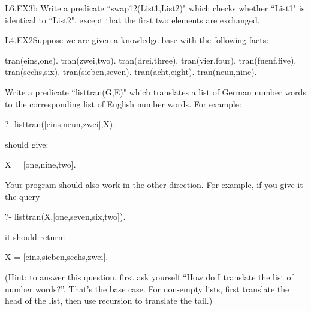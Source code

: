 \begin{LPNexercise}{L6.EX3b}
Write a predicate ``swap12(List1,List2)" which checks
whether ``List1" is identical to ``List2", except that the
first two elements are exchanged.
\end{LPNexercise}


\begin{LPNexercise}{L4.EX2}Suppose we are given a knowledge base with the following facts:

\begin{LPNcodedisplay}
tran(eins,one).
tran(zwei,two).
tran(drei,three).
tran(vier,four).
tran(fuenf,five).
tran(sechs,six).
tran(sieben,seven).
tran(acht,eight).
tran(neun,nine).
\end{LPNcodedisplay}



Write a predicate ``listtran(G,E)" which translates a list of
German number words to the corresponding list of English number words.
For example:
\begin{LPNcodedisplay}
?- listtran([eins,neun,zwei],X).
\end{LPNcodedisplay}
should give:
\begin{LPNcodedisplay}
X = [one,nine,two].
\end{LPNcodedisplay}

Your program should also work in the other direction. For example, if
you give it the query
\begin{LPNcodedisplay}
?- listtran(X,[one,seven,six,two]).
\end{LPNcodedisplay}
it should return:
\begin{LPNcodedisplay}
X = [eins,sieben,sechs,zwei].
\end{LPNcodedisplay}


(Hint: to answer this question, first ask yourself ``How do I
translate the  list of number words?''.  That's the base
case.  For non-empty lists, first translate the head of the list, then
use recursion to translate the tail.)
\end{LPNexercise}



